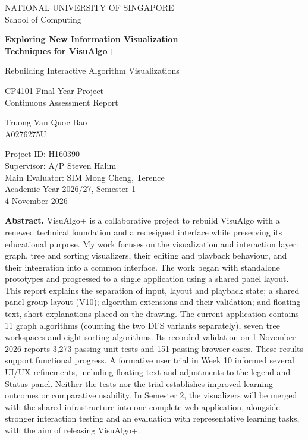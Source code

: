 \documentclass[11pt,a4paper]{article}
\begin{document}
\begin{titlepage}
\centering
{\large NATIONAL UNIVERSITY OF SINGAPORE\\School of Computing\par}
\vspace{16mm}
{\LARGE\bfseries\color{navy}Exploring New Information Visualization\\Techniques for VisuAlgo+\par}
\vspace{4mm}
{\large Rebuilding Interactive Algorithm Visualizations\par}
\vspace{9mm}
{\Large CP4101 Final Year Project\\Continuous Assessment Report\par}
\vspace{10mm}
{\large Truong Van Quoc Bao\\A0276275U\par}
\vspace{6mm}
{Project ID: H160390\\Supervisor: A/P Steven Halim\\Main Evaluator: SIM Mong Cheng, Terence\\Academic Year 2026/27, Semester 1\\4 November 2026\par}
\vspace{9mm}
\begin{minipage}{.94\textwidth}
\textbf{Abstract.} VisuAlgo+ is a collaborative project to rebuild VisuAlgo with a renewed technical foundation and a redesigned interface while preserving its educational purpose. My work focuses on the visualization and interaction layer: graph, tree and sorting visualizers, their editing and playback behaviour, and their integration into a common interface. The work began with standalone prototypes and progressed to a single application using a shared panel layout. This report explains the separation of input, layout and playback state; a shared panel-group layout (V10); algorithm extensions and their validation; and floating text, short explanations placed on the drawing. The current application contains 11 graph algorithms (counting the two DFS variants separately), seven tree workspaces and eight sorting algorithms. Its recorded validation on 1 November 2026 reports 3,273 passing unit tests and 151 passing browser cases. These results support functional progress. A formative user trial in Week 10 informed several UI/UX refinements, including floating text and adjustments to the legend and Status panel. Neither the tests nor the trial establishes improved learning outcomes or comparative usability. In Semester 2, the visualizers will be merged with the shared infrastructure into one complete web application, alongside stronger interaction testing and an evaluation with representative learning tasks, with the aim of releasing VisuAlgo+.
\end{minipage}
\end{titlepage}
\setcounter{page}{2}
\end{document}

